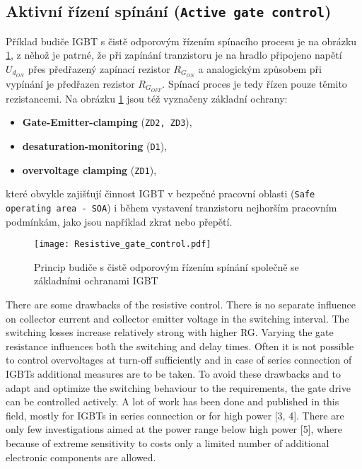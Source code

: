      \subsection{Aktivní řízení spínání (\texttt{Active gate con\-trol})}
       Příklad budiče IGBT s čistě odporovým řízením spínacího procesu je na obrázku \ref{VE:fig_res_gate_drv}, z něhož
       je patrné, že při zapínání tranzistoru je na hradlo připojeno napětí $U_{d_{ON}}$ přes předřazený zapínací 
       rezistor $R_{G_{ON}}$ a analogickým způsobem při vypínání je předřazen rezistor $R_{G_{OFF}}$. Spínací proces je 
       tedy řízen pouze těmito rezistancemi. Na obrázku \ref{VE:fig_res_gate_drv} jsou též vyznačeny základní ochrany:
       \begin{itemize}
         \item \textbf{Gate-Emitter-clamping} (\texttt{ZD2, ZD3}),
         \item \textbf{desaturation-monitoring} (\texttt{D1}),
         \item \textbf{overvoltage clamping} (\texttt{ZD1}),
       \end{itemize}
      které obvykle zajišťují činnost IGBT v bezpečné pracovní oblasti (\texttt{Safe operating area - SOA}) i během 
      vystavení tranzistoru nejhorším pracovním podmínkám, jako jsou například zkrat nebo přepětí.

      \begin{figure}[ht!]
        \centering
        \texttt{[image: Resistive\_gate\_control.pdf]}
        \caption{Princip budiče s čistě odporovým řízením spínání společně se základními ochranami IGBT}\label{VE:fig_res_gate_drv}
      \end{figure}

      There are some drawbacks of the resistive control. There is no separate influence on collector current and 
      collector emitter voltage in the switching interval. The switching losses increase relatively strong with 
      higher RG. Varying the gate resistance influences both the switching and delay times. Often it is not possible 
      to control overvoltages at turn-off sufficiently and in case of series connection of IGBTs additional measures 
      are to be taken. To avoid these drawbacks and to adapt and optimize the switching behaviour to the requirements, 
      the gate drive can be controlled actively. A lot of work has been done and published in this field, mostly for 
      IGBTs in series connection or for high power [3, 4]. There are only few investigations aimed at the power range 
      below high power [5], where because of extreme sensitivity to costs only a limited number of additional electronic 
      components are allowed.

